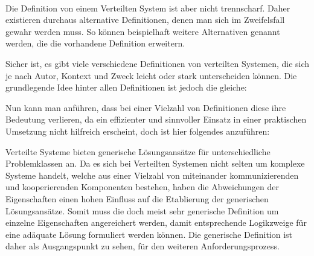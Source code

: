 \documentclass[../vs-script-first-v01.tex]{subfiles}
\begin{document}
\mbox{}\\
Die Definition von einem Verteilten System ist aber nicht trennscharf. Daher existieren durchaus alternative Definitionen, denen man sich im Zweifelsfall gewahr werden muss. So können beispielhaft weitere Alternativen genannt werden, die die vorhandene Definition erweitern.

Sicher ist, es gibt viele verschiedene Definitionen von verteilten Systemen, die sich je nach Autor, Kontext und Zweck leicht oder stark unterscheiden können. Die grundlegende Idee hinter allen Definitionen ist jedoch die gleiche: 


Nun kann man anführen, dass bei einer Vielzahl von Definitionen diese ihre Bedeutung verlieren, da ein effizienter und sinnvoller Einsatz in einer praktischen Umsetzung nicht hilfreich erscheint, doch ist hier folgendes anzuführen:

Verteilte Systeme bieten generische Lösungsansätze für unterschiedliche Problemklassen an. Da es sich bei Verteilten Systemen nicht selten um komplexe Systeme handelt, welche aus einer Vielzahl von miteinander kommunizierenden und kooperierenden Komponenten bestehen, haben die Abweichungen der Eigenschaften einen hohen Einfluss auf die Etablierung der generischen Lösungsansätze. Somit muss die doch meist sehr generische Definition um einzelne Eigenschaften angereichert werden, damit entsprechende Logikzweige für eine adäquate Lösung formuliert werden können. Die generische Definition ist daher als Ausgangspunkt zu sehen, für den weiteren Anforderungsprozess. 
\end{document}
